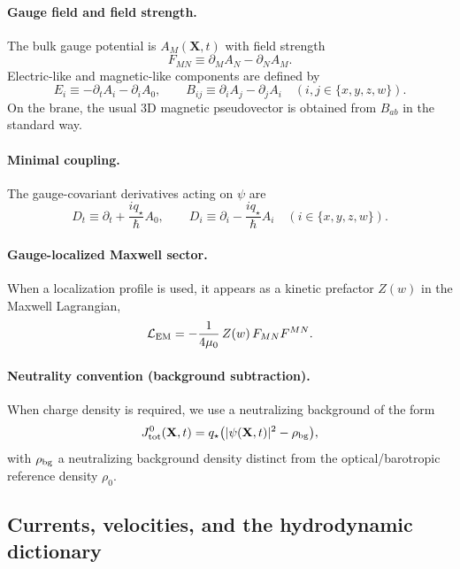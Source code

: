 \documentclass[11pt]{article}
\newcommand{\qstar}{q_\star}
\begin{document}
\paragraph{Gauge field and field strength.}
The bulk gauge potential is $A_M(\mathbf X,t)$ with field strength
\begin{equation}
  F_{MN} \equiv \partial_M A_N - \partial_N A_M.
\end{equation}
Electric-like and magnetic-like components are defined by
\begin{equation}
  E_i \equiv -\partial_t A_i - \partial_i A_0,
  \qquad
  B_{ij} \equiv \partial_i A_j - \partial_j A_i \quad (i,j\in\{x,y,z,w\}).
\end{equation}
On the brane, the usual 3D magnetic pseudovector is obtained from $B_{ab}$ in the standard way.

\paragraph{Minimal coupling.}
The gauge-covariant derivatives acting on $\psi$ are
\begin{equation}
  D_t \equiv \partial_t + \frac{i \qstar}{\hbar}A_0,
  \qquad
  D_i \equiv \partial_i - \frac{i \qstar}{\hbar}A_i \quad (i\in\{x,y,z,w\}).
\end{equation}

\paragraph{Gauge-localized Maxwell sector.}
When a localization profile is used, it appears as a kinetic prefactor $Z(w)$ in the Maxwell Lagrangian,
\begin{equation}
  \mathcal L_{\rm EM} = -\frac{1}{4\mu_0}\,Z(w)\,F_{MN}F^{MN}.
\end{equation}

\paragraph{Neutrality convention (background subtraction).}
When charge density is required, we use a neutralizing background of the form
\begin{equation}
  J^0_{\rm tot}(\mathbf X,t)=\qstar\big(|\psi(\mathbf X,t)|^2-\rho_{\rm bg}\big),
\end{equation}
with \(\rho_{\rm bg}\) a neutralizing background density distinct from the optical/barotropic reference density \(\rho_0\).

\subsection{Currents, velocities, and the hydrodynamic dictionary}
\end{document}
